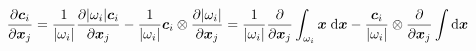 \documentclass{article}
\newcommand{\xx}{\bm{x}}
\begin{document}
\begin{equation}
	\pdv{\bm{c}_i}{\xx_j} = \frac{1}{|\omega_i|} \pdv{|\omega_i| \bm{c}_i}{\xx_j} - \frac{1}{|\omega_i|}\bm{c}_i \otimes \pdv{|\omega_i|}{\xx_j} = \frac{1}{|\omega_i|}\pdv{}{\xx_j}\int_{\omega_i} \xx \; \dd \xx -  \frac{\bm{c}_i}{|\omega_i|} \otimes \pdv{}{\xx_j} \int \dd \xx
\end{equation}
\end{document}
